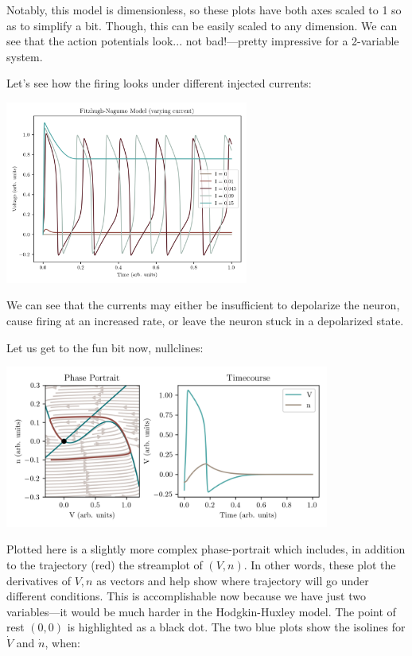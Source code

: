 Notably, this model is dimensionless, so these plots have both axes scaled to 1 so as to simplify a bit. Though, this can be easily scaled to any dimension. We can see that the action potentials look... not bad!---pretty impressive for a 2-variable system.\newline

Let's see how the firing looks under different injected currents: 

\begin{center}
\includegraphics[width=0.6\textwidth]{images/models/fhn2.png}
\end{center}

We can see that the currents may either be insufficient to depolarize the neuron, cause firing at an increased rate, or leave the neuron stuck in a depolarized state. 

Let us get to the fun bit now, nullclines: 


\begin{center}
\includegraphics[width=0.8\textwidth]{images/models/fhnphase1.png}
\end{center}

Plotted here is a slightly more complex phase-portrait which includes, in addition to the trajectory (red) the streamplot of $(V, n)$. In other words, these plot the derivatives of $V,n$ as vectors and help show where trajectory will go under different conditions. This is accomplishable now because we have just two variables---it would be much harder in the Hodgkin-Huxley model. The point of rest $(0,0)$ is highlighted as a black dot. The two blue plots show the isolines for $\dot{V}$ and $\dot{n}$, when: 

